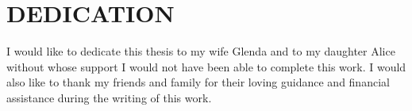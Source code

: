 \chapter*{DEDICATION}

I would like to dedicate this thesis to my wife Glenda and
to my daughter Alice without whose support I would not have
been able to complete this work.
I would also like to thank my friends and family for their loving guidance and
financial assistance during the writing of this work.

